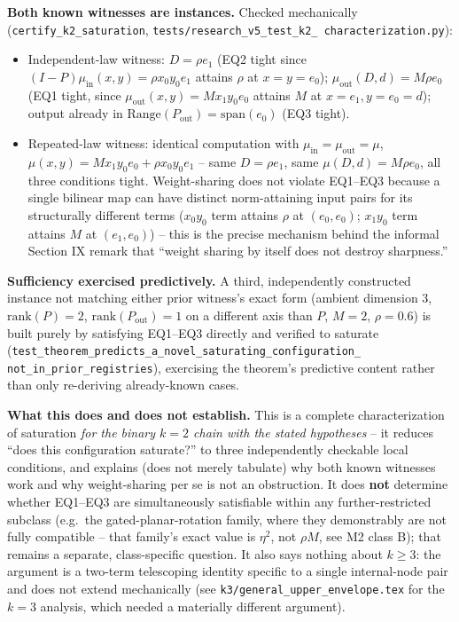 \textbf{Both known witnesses are instances.} Checked mechanically
(\texttt{certify\_k2\_saturation}, \texttt{tests/research\_v5\_test\_k2\_
characterization.py}):
\begin{itemize}
  \item Independent-law witness: $D=\rho e_1$ (EQ2 tight since
  $(I-P)\mu_{\mathrm{in}}(x,y)=\rho x_0y_0e_1$ attains $\rho$ at $x=y=e_0$);
  $\mu_{\mathrm{out}}(D,d)=M\rho e_0$ (EQ1 tight, since $\mu_{\mathrm{out}}(x,y)
  =Mx_1y_0e_0$ attains $M$ at $x=e_1,y=e_0=d$); output already in
  $\mathrm{Range}(P_{\mathrm{out}})=\mathrm{span}(e_0)$ (EQ3 tight).
  \item Repeated-law witness: identical computation with
  $\mu_{\mathrm{in}}=\mu_{\mathrm{out}}=\mu$, $\mu(x,y)=Mx_1y_0e_0+\rho
  x_0y_0e_1$ -- same $D=\rho e_1$, same $\mu(D,d)=M\rho e_0$, all three
  conditions tight. Weight-sharing does not violate EQ1--EQ3 because a
  single bilinear map can have distinct norm-attaining input pairs for its
  structurally different terms ($x_0y_0$ term attains $\rho$ at $(e_0,e_0)$;
  $x_1y_0$ term attains $M$ at $(e_1,e_0)$) -- this is the precise mechanism
  behind the informal Section IX remark that ``weight sharing by itself
  does not destroy sharpness.''
\end{itemize}

\textbf{Sufficiency exercised predictively.} A third, independently
constructed instance not matching either prior witness's exact form
(ambient dimension 3, $\mathrm{rank}(P)=2$, $\mathrm{rank}(P_{\mathrm
{out}})=1$ on a different axis than $P$, $M=2$, $\rho=0.6$) is built purely
by satisfying EQ1--EQ3 directly and verified to saturate
(\texttt{test\_theorem\_predicts\_a\_novel\_saturating\_configuration\_
not\_in\_prior\_registries}), exercising the theorem's predictive content
rather than only re-deriving already-known cases.

\textbf{What this does and does not establish.} This is a complete
characterization of saturation \emph{for the binary $k=2$ chain with the
stated hypotheses} -- it reduces ``does this configuration saturate?'' to
three independently checkable local conditions, and explains (does not
merely tabulate) why both known witnesses work and why weight-sharing per
se is not an obstruction. It does \textbf{not} determine whether EQ1--EQ3
are simultaneously satisfiable within any further-restricted subclass (e.g.\
the gated-planar-rotation family, where they demonstrably are not fully
compatible -- that family's exact value is $\eta^2$, not $\rho M$, see M2
class B); that remains a separate, class-specific question. It also says
nothing about $k\ge3$: the argument is a two-term telescoping identity
specific to a single internal-node pair and does not extend mechanically
(see \texttt{k3/general\_upper\_envelope.tex} for the $k=3$ analysis, which
needed a materially different argument).


